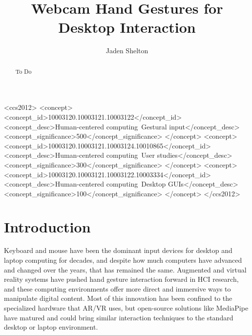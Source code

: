 \documentclass[sigconf]{acmart}
\begin{document}
\title{Webcam Hand Gestures for Desktop Interaction}

\author{Jaden Shelton}

\renewcommand{\shortauthors}{Shelton}

\begin{abstract}
To Do
\end{abstract}

\begin{CCSXML}
<ccs2012>
 <concept>
  <concept_id>10003120.10003121.10003122</concept_id>
  <concept_desc>Human-centered computing~Gestural input</concept_desc>
  <concept_significance>500</concept_significance>
 </concept>
 <concept>
  <concept_id>10003120.10003121.10003124.10010865</concept_id>
  <concept_desc>Human-centered computing~User studies</concept_desc>
  <concept_significance>300</concept_significance>
 </concept>
 <concept>
  <concept_id>10003120.10003121.10003122.10003334</concept_id>
  <concept_desc>Human-centered computing~Desktop GUIs</concept_desc>
  <concept_significance>100</concept_significance>
 </concept>
</ccs2012>
\end{CCSXML}



\maketitle

\section{Introduction}

Keyboard and mouse have been the dominant input devices for desktop and laptop computing for decades, and despite how much computers have advanced and changed over the years, that has remained the same. Augmented and virtual reality systems have pushed hand gesture interaction forward in HCI research, and these computing environments offer more direct and immersive ways to manipulate digital content. Most of this innovation has been confined to the specialized hardware that AR/VR uses, but open-source solutions like MediaPipe have matured and could bring similar interaction techniques to the standard desktop or laptop environment.
\end{document}
